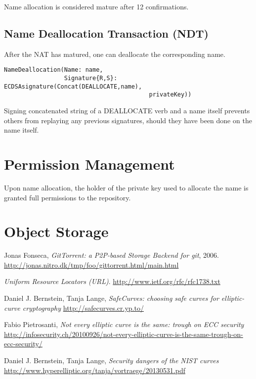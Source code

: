 \documentclass[a4paper]{article}
\begin{document}
Name allocation is considered mature after 12 confirmations.

\subsection{Name Deallocation Transaction (NDT)}

After the NAT has matured, one can deallocate the corresponding name.

\begin{verbatim}
NameDeallocation(Name: name,
                 Signature{R,S}: ECDSAsignature(Concat(DEALLOCATE,name),
                                         privateKey))
\end{verbatim}

Signing concatenated string of a DEALLOCATE verb and a name itself prevents others from replaying any previous signatures, should they have been done on the name itself.

\section{Permission Management}

Upon name allocation, the holder of the private key used to allocate the name is granted full permissions to the repository.

\section{Object Storage}


\begin{thebibliography}{9}

  Jonas Fonseca,
  \emph{GitTorrent: a P2P-based Storage Backend for git}, 2006.
  \url{http://jonas.nitro.dk/tmp/foo/gittorrent.html/main.html}

  \emph{Uniform Resource Locators (URL)}.
  \url{http://www.ietf.org/rfc/rfc1738.txt}

  Daniel J. Bernstein, Tanja Lange,
  \emph{SafeCurves: choosing safe curves for elliptic-curve cryptography}
  \url{http://safecurves.cr.yp.to/}

  Fabio Pietrosanti,
  \emph{Not every elliptic curve is the same: trough on ECC security}
  \url{http://infosecurity.ch/20100926/not-every-elliptic-curve-is-the-same-trough-on-ecc-security/}

  Daniel J. Bernstein, Tanja Lange,
  \emph{Security dangers of the NIST curves}
  \url{http://www.hyperelliptic.org/tanja/vortraege/20130531.pdf}

\end{thebibliography}
\end{document}
